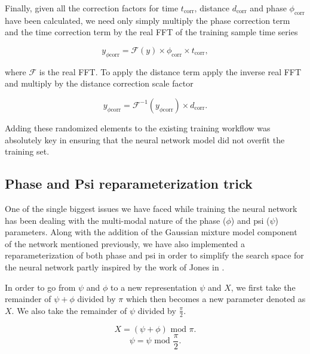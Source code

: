 Finally, given all the correction factors for time $t_{\textrm{corr}}$, 
distance $d_{\textrm{corr}}$ and phase $\phi_{\textrm{corr}}$ have been 
calculated, we need only simply multiply 
the phase correction term and the time correction term by the real 
\ac{FFT} of the training sample time series

\begin{equation}
    y_{\phi \textrm{corr}} = \mathcal{F}(y) \times \phi_{\textrm{corr}} \times t_{\textrm{corr}},
\end{equation}

where $\mathcal{F}$ is the real \ac{FFT}. To apply the distance term 
apply the inverse real \ac{FFT} and multiply by the distance correction 
scale factor

\begin{equation}
    y_{\phi \textrm{corr}} = \mathcal{F}^{-1}(y_{\phi \textrm{corr}}) \times d_{\textrm{corr}}. 
\end{equation}

Adding these randomized elements to the existing training workflow 
was absolutely key in ensuring that the neural network model did 
not overfit the training set.

\subsection{Phase and Psi reparameterization trick}\label{subsec:phipsi_repar}

One of the single biggest issues we have faced while training the neural network 
has been dealing with the multi-modal nature of the phase ($\phi$) and psi 
($\psi$) parameters. Along with the addition of the Gaussian mixture model 
component of the network mentioned previously, we have also implemented 
a reparameterization of both phase and psi in order to simplify the 
search space for the neural network partly inspired by the work of Jones in \cite{10.1093/mnras/stv1584}.

In order to 
go from $\psi$ and $\phi$ to a new representation $\psi$ and $X$, we first take the 
remainder of $\psi + \phi$ divided by $\pi$ which then becomes a new parameter denoted as $X$.
We also take the remainder of $\psi$ divided by $\frac{\pi}{2}$.

\begin{equation}
    X = (\psi + \phi) \textrm{ mod } \pi.
\end{equation}
\begin{equation}
    \psi = \psi \textrm{ mod } \frac{\pi}{2}. 
\end{equation}


